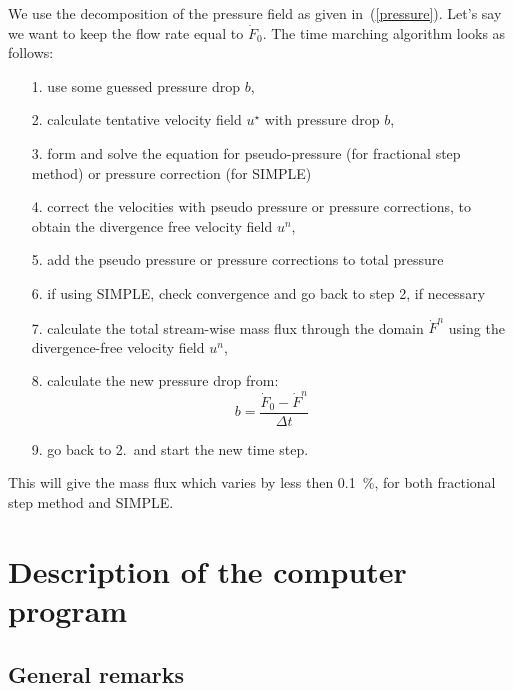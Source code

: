 \documentclass[10pt]{article}
\begin{document}
    We use the decomposition of the pressure field as given 
    in~(\ref{pressure}). Let's say we want to keep the flow
    rate equal to $\dot{F}_0$. The time marching algorithm
    looks as follows:
    \begin{itemize}
    \item[1.] use some guessed pressure drop $b$,
    \item[2.] calculate tentative velocity field $u^\star$
              with pressure drop $b$,
    \item[3.] form and solve the equation for pseudo-pressure
              (for fractional step method) or pressure
              correction (for SIMPLE)
    \item[4.] correct the velocities with pseudo pressure or
              pressure corrections, to obtain the divergence
              free velocity field $u^n$,
    \item[5.] add the pseudo pressure or pressure corrections 
              to total pressure
    \item[6.] if using SIMPLE, check convergence 
              and go back to step 2, if necessary 
    \item[7.] calculate the total stream-wise mass flux through
              the domain $\dot{F}^n$ using the divergence-free velocity
              field $u^n$,
    \item[8.] calculate the new pressure drop from:
              \begin{equation}
              b = \frac{\dot{F}_0 - \dot{F}^n}{\Delta t}
              \end{equation}
    \item[9.] go back to 2.\ and start the new time step.
    \end{itemize}
    This will give the mass flux which varies by less then 0.1~\%,
    for both fractional step method and SIMPLE.

%
    \newpage
    \section{Description of the computer program}
%

    \subsection{General remarks}
\end{document}
